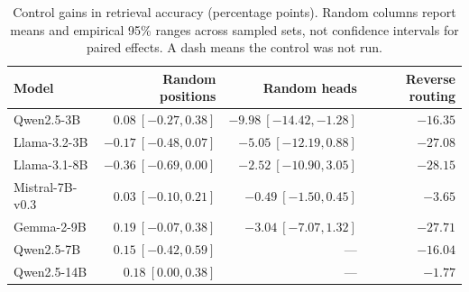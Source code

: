 \begin{table}[htbp]
\centering
\footnotesize
\setlength{\tabcolsep}{6pt}
\caption{Control gains in retrieval accuracy (percentage points). Random
columns report means and empirical 95\% ranges across sampled sets, not
confidence intervals for paired effects. A dash means the control was not run.}
\label{tab:repair-controls}
\begin{tabular}{@{}lrrr@{}}
\toprule
Model & Random positions & Random heads & Reverse routing \\
\midrule
Qwen2.5-3B & $0.08\ [-0.27, 0.38]$ & $-9.98\ [-14.42, -1.28]$ & $-16.35$ \\
Llama-3.2-3B & $-0.17\ [-0.48, 0.07]$ & $-5.05\ [-12.19, 0.88]$ & $-27.08$ \\
Llama-3.1-8B & $-0.36\ [-0.69, 0.00]$ & $-2.52\ [-10.90, 3.05]$ & $-28.15$ \\
Mistral-7B-v0.3 & $0.03\ [-0.10, 0.21]$ & $-0.49\ [-1.50, 0.45]$ & $-3.65$ \\
Gemma-2-9B & $0.19\ [-0.07, 0.38]$ & $-3.04\ [-7.07, 1.32]$ & $-27.71$ \\
\addlinespace[2pt]
Qwen2.5-7B & $0.15\ [-0.42, 0.59]$ & --- & $-16.04$ \\
Qwen2.5-14B & $0.18\ [0.00, 0.38]$ & --- & $-1.77$ \\
\bottomrule
\end{tabular}
\end{table}
